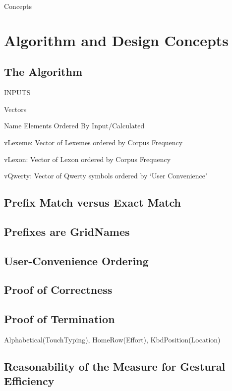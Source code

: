 Concepts
\chapter{Algorithm and Design Concepts}\label{algorithm-and-design-concepts}

\section{The Algorithm}\label{the-algorithm}
INPUTS

Vectors

Name Elements Ordered By Input/Calculated

vLexeme: Vector of Lexemes ordered by Corpus Frequency

vLexon: Vector of Lexon ordered by Corpus Frequency

vQwerty: Vector of Qwerty symbols ordered by `User Convenience'

\section{Prefix Match versus Exact
Match}\label{prefix-match-versus-exact-match}

\section{Prefixes are GridNames}\label{prefixes-are-gridnames}
\section{User-Convenience
Ordering}\label{user-convenience-ordering}

\section{Proof of Correctness}\label{proof-of-correctness}
\section{Proof of Termination}\label{proof-of-termination}
Alphabetical(TouchTyping), HomeRow(Effort), KbdPosition(Location)

\section{Reasonability of the Measure for Gestural
Efficiency}\label{reasonability-of-the-measure-for-gestural-efficiency}

